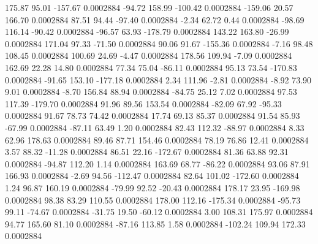      175.87       95.01     -157.67     0.0002884
      -94.72      158.99     -100.42     0.0002884
     -159.06       20.57      166.70     0.0002884
       87.51       94.44      -97.40     0.0002884
       -2.34       62.72        0.44     0.0002884
      -98.69      116.14      -90.42     0.0002884
      -96.57       63.93     -178.79     0.0002884
      143.22      163.80      -26.99     0.0002884
      171.04       97.33      -71.50     0.0002884
       90.06       91.67     -155.36     0.0002884
       -7.16       98.48      108.45     0.0002884
      100.69       24.69       -4.47     0.0002884
      178.56      109.94       -7.09     0.0002884
      162.69       22.28       14.80     0.0002884
       77.34       75.04      -86.11     0.0002884
       95.13       73.54     -170.83     0.0002884
      -91.65      153.10     -177.18     0.0002884
        2.34      111.96       -2.81     0.0002884
       -8.92       73.90        9.01     0.0002884
       -8.70      156.84       88.94     0.0002884
      -84.75       25.12        7.02     0.0002884
       97.53      117.39     -179.70     0.0002884
       91.96       89.56      153.54     0.0002884
      -82.09       67.92      -95.33     0.0002884
       91.67       78.73       74.42     0.0002884
       17.74       69.13       85.37     0.0002884
       91.54       85.93      -67.99     0.0002884
      -87.11       63.49        1.20     0.0002884
       82.43      112.32      -88.97     0.0002884
        8.33       62.96      178.63     0.0002884
       89.46       87.71      154.46     0.0002884
       78.19       76.86       12.41     0.0002884
        3.57       88.32      -11.28     0.0002884
       86.51       22.16     -172.67     0.0002884
       81.36       63.88       92.31     0.0002884
      -94.87      112.20        1.14     0.0002884
      163.69       68.77      -86.22     0.0002884
       93.06       87.91      166.93     0.0002884
       -2.69       94.56     -112.47     0.0002884
       82.64      101.02     -172.60     0.0002884
        1.24       96.87      160.19     0.0002884
      -79.99       92.52      -20.43     0.0002884
      178.17       23.95     -169.98     0.0002884
       98.38       83.29      110.55     0.0002884
      178.00      112.16     -175.34     0.0002884
      -95.73       99.11      -74.67     0.0002884
      -31.75       19.50      -60.12     0.0002884
        3.00      108.31      175.97     0.0002884
       94.77      165.60       81.10     0.0002884
      -87.16      113.85        1.58     0.0002884
     -102.24      109.94      172.33     0.0002884
